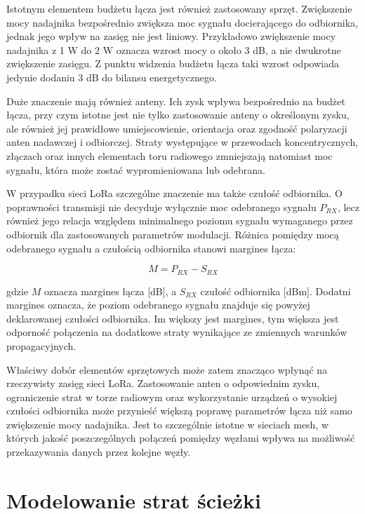 \documentclass[12pt,a4paper,twoside]{report}
\theoremstyle{definition} %
\begin{document}
Istotnym elementem budżetu łącza jest również zastosowany sprzęt. Zwiększenie mocy nadajnika bezpośrednio zwiększa moc sygnału docierającego do odbiornika, jednak jego wpływ na zasięg nie jest liniowy. Przykładowo zwiększenie mocy nadajnika z 1 W do 2 W oznacza wzrost mocy o około 3 dB, a nie dwukrotne zwiększenie zasięgu. Z punktu widzenia budżetu łącza taki wzrost odpowiada jedynie dodaniu 3 dB do bilansu energetycznego.

Duże znaczenie mają również anteny. Ich zysk wpływa bezpośrednio na budżet łącza, przy czym istotne jest nie tylko zastosowanie anteny o określonym zysku, ale również jej prawidłowe umiejscowienie, orientacja oraz zgodność polaryzacji anten nadawczej i odbiorczej. Straty występujące w przewodach koncentrycznych, złączach oraz innych elementach toru radiowego zmniejszają natomiast moc sygnału, która może zostać wypromieniowana lub odebrana.

W przypadku sieci LoRa szczególne znaczenie ma także czułość odbiornika. O poprawności transmisji nie decyduje wyłącznie moc odebranego sygnału \(P_{RX}\), lecz również jego relacja względem minimalnego poziomu sygnału wymaganego przez odbiornik dla zastosowanych parametrów modulacji. Różnica pomiędzy mocą odebranego sygnału a czułością odbiornika stanowi margines łącza:

	\begin{equation}\label{M}
        M = P_{RX} - S_{RX}
    \end{equation}

gdzie \(M\) oznacza margines łącza [dB], a \(S_{RX}\) czułość odbiornika [dBm]. Dodatni margines oznacza, że poziom odebranego sygnału znajduje się powyżej deklarowanej czułości odbiornika. Im większy jest margines, tym większa jest odporność połączenia na dodatkowe straty wynikające ze zmiennych warunków propagacyjnych.

Właściwy dobór elementów sprzętowych może zatem znacząco wpłynąć na rzeczywisty zasięg sieci LoRa. Zastosowanie anten o odpowiednim zysku, ograniczenie strat w torze radiowym oraz wykorzystanie urządzeń o wysokiej czułości odbiornika może przynieść większą poprawę parametrów łącza niż samo zwiększenie mocy nadajnika. Jest to szczególnie istotne w sieciach mesh, w których jakość poszczególnych połączeń pomiędzy węzłami wpływa na możliwość przekazywania danych przez kolejne węzły.

\section{Modelowanie strat ścieżki}
\end{document}
